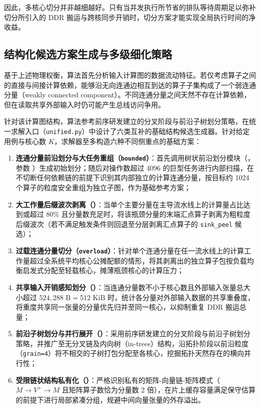 \documentclass[anonymous,notoc]{gmcm2026}
\providecommand{\tightlist}{\setlength{\itemsep}{0pt}\setlength{\parskip}{0pt}}
\begin{document}
因此，多核心切分并非越细越好。只有当并发执行所节省的排队等待周期足以弥补切分所引入的 DDR 搬运与跨核同步开销时，切分方案才能实现全局执行时间的净收益。

\subsection{结构化候选方案生成与多级细化策略}

基于上述物理权衡，算法首先分析输入计算图的数据流动特征。若仅考虑算子之间的直接与间接计算依赖，能够沿无向连通边相互到达的算子子集构成了一个弱连通分量（weakly connected component）。不同连通分量之间天然不存在计算依赖，但在读取共享外部输入时仍可能产生总线访问争用。

针对该计算图结构，算法参考前序研发建立的分叉阶段与前沿子树划分策略，在统一求解入口（\texttt{unified.py}）中设计了六类互补的基础结构候选生成器。针对给定用例与核心数 \(K\)，求解器至多构造六种不同侧重点的基础方案：

\begin{enumerate}
\def\labelenumi{\arabic{enumi}.}
\tightlist
\item
  \textbf{连通分量前沿划分与大任务重组（\texttt{bounded}）}：首先调用树状前沿划分模块（\texttt{}，参数 \texttt{}）生成初始划分；随后对操作数超过 4096 的巨型任务进行内部扫描，在不切断任何依赖链的前提下识别其内部独立的计算连通分量，按目标约 1024 个算子的粒度安全重组为独立子图，作为基础参考方案；
\item
  \textbf{大工作量后缀波次剥离（\texttt{}）}：当单个主要分量在主导流水线上的计算量占比达到或超过 80\% 且分量数充足时，将该瓶颈分量的末端汇点算子剥离为粗粒度后缀波次（若不满足触发条件则回退至分层剥离汇点算子的 \texttt{sink\_peel} 候选）；
\item
  \textbf{过载连通分量切分（\texttt{overload}）}：针对单个连通分量在任一流水线上的计算工作量超过全系统平均核心公摊配额的情形，将其剥离出的独立算子包按负载均衡启发式分配至轻载核心，摊薄瓶颈核心的计算压力；
\item
  \textbf{共享输入开销感知划分（\texttt{}）}：当连通分量数不小于核心数且外部输入张量总大小超过 \(524{,}288 \text{ B} = 512 \text{ KiB}\) 时，统计各分量对外部输入数据的共享重叠度，将重度共享同一张量的分量优先归并至同一核心，以抑制重复 DDR 搬运总量；
\item
  \textbf{前沿子树划分与并行展开（\texttt{}）}：采用前序研发建立的分叉阶段与前沿子树划分策略，并推广至无分叉链及内向树（in-trees）结构，沿拓扑阶段以前沿粒度（\texttt{grain=4}）将不相交的子树打包分配至各核心，挖掘拓扑天然存在的横向并行性；
\item
  \textbf{受限链状结构私有化（\texttt{}）}：严格识别私有的矩阵-向量链-矩阵模式（\(M \to V^+ \to M\) 且矩阵算子数恰为分量数 2 倍），在片上缓存容量满足保守估算的前提下进行局部紧凑分组，规避中间向量张量的外存溢出。
\end{enumerate}
\end{document}
